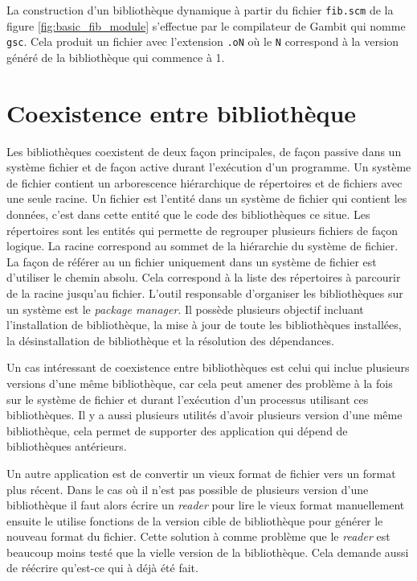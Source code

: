 \vspace{-20pt}
La construction d'un bibliothèque dynamique à partir du fichier \texttt{fib.scm}
de la figure \ref{fig:basic_fib_module} s'effectue par le compilateur de Gambit
qui nomme \texttt{gsc}. Cela produit un fichier avec l'extension \texttt{.oN}
où le \texttt{N} correspond à la version généré de la bibliothèque qui commence à 1.


\section{Coexistence entre bibliothèque}
Les bibliothèques coexistent de deux façon principales, de façon passive dans
un système fichier et de façon active durant l'exécution d'un programme.  Un
système de fichier contient un arborescence hiérarchique de répertoires et de
fichiers avec une seule racine. Un fichier est l'entité dans un système de
fichier qui contient les données, c'est dans cette entité que le code des
bibliothèques ce situe.  Les répertoires sont les entités qui permette de
regrouper plusieurs fichiers de façon logique. La racine correspond au sommet
de la hiérarchie du système de fichier. La façon de référer au un fichier
uniquement dans un système de fichier est d'utiliser le chemin absolu. Cela
correspond à la liste des répertoires à parcourir de la racine jusqu'au
fichier. L'outil responsable d'organiser les bibliothèques sur un système
est le \textit{package manager}. Il possède plusieurs objectif incluant
l'installation de bibliothèque, la mise à jour de toute les bibliothèques
installées, la désinstallation de bibliothèque et la résolution des dépendances.

Un cas intéressant de coexistence entre bibliothèques est celui qui inclue
plusieurs versions d'une même bibliothèque, car cela peut amener des problème
à la fois sur le système de fichier et durant l'exécution d'un processus utilisant
ces bibliothèques. Il y a aussi plusieurs utilités d'avoir plusieurs version
d'une même bibliothèque, cela permet de supporter des application qui dépend de
bibliothèques antérieurs.

Un autre application est de convertir un vieux format de fichier vers un format
plus récent. Dans le cas où il n'est pas possible de plusieurs version d'une bibliothèque
il faut alors écrire un \textit{reader} pour lire le vieux format manuellement ensuite le
utilise fonctions de la version cible de bibliothèque pour générer le nouveau format du fichier.
Cette solution à comme problème que le \textit{reader} est beaucoup moins testé que la
vielle version de la bibliothèque. Cela demande aussi de réécrire qu'est-ce qui à déjà été fait.

